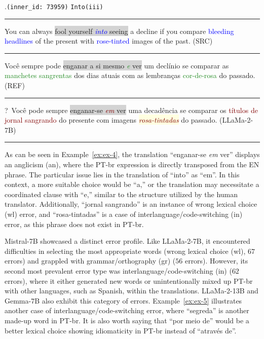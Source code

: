 \ex.\texttt{(inner\_id: 73959)} \hfill \texttt{Into(iii)} \\[0.3ex]
\noindent\rule{\linewidth}{0.9pt}
You can always \colorbox{lightgray}{fool yourself \emph{\textcolor{blue}{into}} seeing} a decline if you compare \textcolor{blue}{bleeding headlines} of the present with \textcolor{blue}{rose-tinted} images of the past. (SRC) \label{ex:ex-4} \\[-0.3ex]
\noindent\rule{\linewidth}{0.3pt}
Você sempre pode \colorbox{lightgray}{enganar a si mesmo \emph{\textcolor{ForestGreen}{e}} ver} um declínio se comparar as  \textcolor{ForestGreen}{manchetes sangrentas} dos dias atuais com as lembranças \textcolor{ForestGreen}{cor-de-rosa} do passado. (REF) \\[-0.3ex]
\noindent\rule{\linewidth}{0.3pt}
?~Você pode sempre \colorbox{lightgray}{enganar-se \emph{\textcolor{Maroon}{em}} ver} uma decadência se comparar os \textcolor{Maroon}{títulos de jornal sangrando} do presente com imagens \colorbox{lightyellow}{\emph{\textcolor{Maroon}{rosa-tintadas}}} do passado. (LLaMa-2-7B) \\[-0.3ex] 
\noindent\rule{\linewidth}{0.9pt}


As can be seen in Example~\ref{ex:ex-4}, the translation ``enganar-se \emph{em} ver'' displays an anglicism (an), where the PT-br expression is directly transposed from the EN phrase. The particular issue lies in the translation of ``into'' as ``em''. In this context, a more suitable choice would be ``a,'' or the translation may necessitate a coordinated clause with ``e,'' similar to the structure utilized by the human translator. Additionally, ``jornal sangrando'' is an instance of wrong lexical choice (wl) error, and ``rosa-tintadas'' is a case of interlanguage/code-switching (in) error, as this phrase does not exist in PT-br.

Mistral-7B showcased a distinct error profile. Like LLaMa-2-7B, it encountered difficulties in selecting the most appropriate words (wrong lexical choice (wl), $67$ errors) and grappled with grammar/orthography (gr) ($56$ errors). However, its second most prevalent error type was interlanguage/code-switching (in) ($62$ errors), where it either generated new words or unintentionally mixed up PT-br with other languages, such as Spanish, within the translations. LLaMa-2-13B and Gemma-7B also exhibit this category of errors. Example~\ref{ex:ex-5} illustrates another case of interlanguage/code-switching error, where ``segreda'' is another made-up word in PT-br. It is also worth saying that ``por meio de'' would be a better lexical choice showing idiomaticity in PT-br instead of ``através de''.

